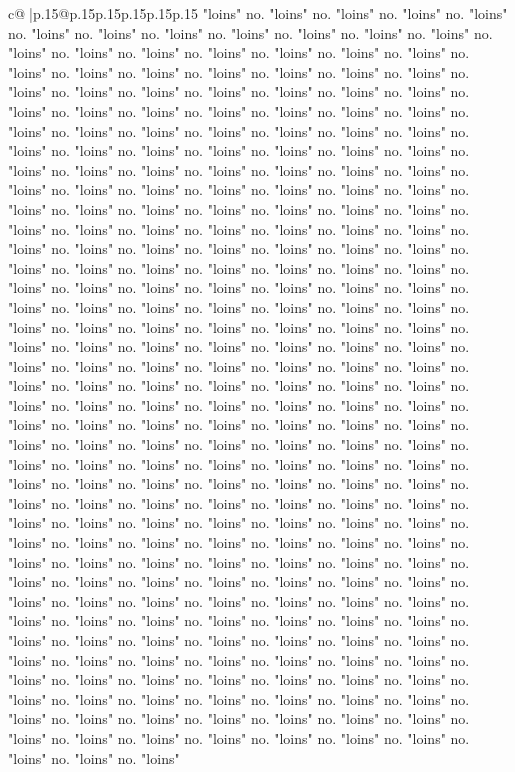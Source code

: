 \documentclass{article}
\begin{document}
{\begin{supertabular}{c@{$\;$}|p{.15\linewidth}@{}p{.15\linewidth}p{.15\linewidth}p{.15\linewidth}p{.15\linewidth}p{.15\linewidth}}
{{{"loins" no. "loins" no. "loins" no. "loins" no. "loins" no. "loins" no. "loins" no. "loins" no. "loins" no. "loins" no. "loins" no. "loins" no. "loins" no. "loins" no. "loins" no. "loins" no. "loins" no. "loins" no. "loins" no. "loins" no. "loins" no. "loins" no. "loins" no. "loins" no. "loins" no. "loins" no. "loins" no. "loins" no. "loins" no. "loins" no. "loins" no. "loins" no. "loins" no. "loins" no. "loins" no. "loins" no. "loins" no. "loins" no. "loins" no. "loins" no. "loins" no. "loins" no. "loins" no. "loins" no. "loins" no. "loins" no. "loins" no. "loins" no. "loins" no. "loins" no. "loins" no. "loins" no. "loins" no. "loins" no. "loins" no. "loins" no. "loins" no. "loins" no. "loins" no. "loins" no. "loins" no. "loins" no. "loins" no. "loins" no. "loins" no. "loins" no. "loins" no. "loins" no. "loins" no. "loins" no. "loins" no. "loins" no. "loins" no. "loins" no. "loins" no. "loins" no. "loins" no. "loins" no. "loins" no. "loins" no. "loins" no. "loins" no. "loins" no. "loins" no. "loins" no. "loins" no. "loins" no. "loins" no. "loins" no. "loins" no. "loins" no. "loins" no. "loins" no. "loins" no. "loins" no. "loins" no. "loins" no. "loins" no. "loins" no. "loins" no. "loins" no. "loins" no. "loins" no. "loins" no. "loins" no. "loins" no. "loins" no. "loins" no. "loins" no. "loins" no. "loins" no. "loins" no. "loins" no. "loins" no. "loins" no. "loins" no. "loins" no. "loins" no. "loins" no. "loins" no. "loins" no. "loins" no. "loins" no. "loins" no. "loins" no. "loins" no. "loins" no. "loins" no. "loins" no. "loins" no. "loins" no. "loins" no. "loins" no. "loins" no. "loins" no. "loins" no. "loins" no. "loins" no. "loins" no. "loins" no. "loins" no. "loins" no. "loins" no. "loins" no. "loins" no. "loins" no. "loins" no. "loins" no. "loins" no. "loins" no. "loins" no. "loins" no. "loins" no. "loins" no. "loins" no. "loins" no. "loins" no. "loins" no. "loins" no. "loins" no. "loins" no. "loins" no. "loins" no. "loins" no. "loins" no. "loins" no. "loins" no. "loins" no. "loins" no. "loins" no. "loins" no. "loins" no. "loins" no. "loins" no. "loins" no. "loins" no. "loins" no. "loins" no. "loins" no. "loins" no. "loins" no. "loins" no. "loins" no. "loins" no. "loins" no. "loins" no. "loins" no. "loins" no. "loins" no. "loins" no. "loins" no. "loins" no. "loins" no. "loins" no. "loins" no. "loins" no. "loins" no. "loins" no. "loins" no. "loins" no. "loins" no. "loins" no. "loins" no. "loins" no. "loins" no. "loins" no. "loins" no. "loins" no. "loins" no. "loins" no. "loins" no. "loins" no. "loins" no. "loins" no. "loins" no. "loins" no. "loins" no. "loins" no. "loins" no. "loins" no. "loins" no. "loins" no. "loins" no. "loins" no. "loins" no. "loins" no. "loins" no. "loins" no. "loins" no. "loins" no. "loins" no. "loins" no. "loins" no. "loins" no. "loins" no. "loins" no. "loins" no. "loins" no. "loins" no. "loins" no. "loins" no. "loins" no. "loins" no. "loins" no. "loins" no. "loins" no. "loins" no. "loins" no. "loins" no. "loins" no. "loins" no. "loins" no. "loins" no. "loins" no. "loins" no. "loins" no. "loins" no. "loins" no. "loins" no. "loins" no. "loins" no. "loins" no. "loins" no. "loins" no. "loins" no. "loins" no. "loins" }}}
\end{supertabular}}
\end{document}
